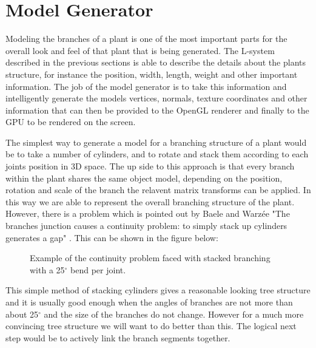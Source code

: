 \section{Model Generator}

\begin{flushleft}

Modeling the branches of a plant is one of the most important parts for the overall look and feel of that plant that is being generated. The L-system described in the previous sections is able to describe the details about the plants structure, for instance the position, width, length, weight and other important information. The job of the model generator is to take this information and intelligently generate the models vertices, normals, texture coordinates and other information that can then be provided to the OpenGL renderer and finally to the GPU to be rendered on the screen. \\

\vspace{5mm}

The simplest way to generate a model for a branching structure of a plant would be to take a number of cylinders, and to rotate and stack them according to each joints position in 3D space. The up side to this approach is that every branch within the plant shares the same object model, depending on the position, rotation and scale of the branch the relavent matrix transforms can be applied. In this way we are able to represent the overall branching structure of the plant. However, there is a problem which is pointed out by Baele and Warz\'{e}e "The branches junction causes a continuity problem: to simply stack up cylinders generates a gap" \cite{baele2005real}. This can be shown in the figure below:

\FloatBarrier

\begin{figure}[htbp]
	{\centering
		\vspace{7px}
		\setlength{\fboxrule}{1pt}
		\caption{Example of the continuity problem faced with stacked branching with a 25$^{\circ}$ bend per joint.}
	}
\end{figure}

\FloatBarrier

\vspace{5mm}


\vspace{5mm}

This simple method of stacking cylinders gives a reasonable looking tree structure and it is usually good enough when the angles of branches are not more than about 25$^{\circ}$ and the size of the branches do not change. However for a much more convincing tree structure we will want to do better than this. The logical next step would be to actively link the branch segments together.


\end{flushleft}
